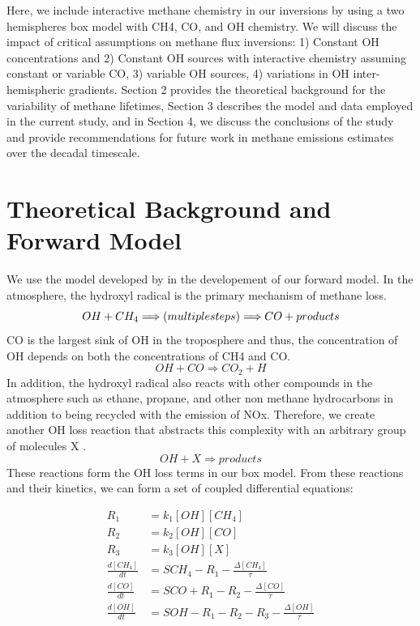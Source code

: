 \documentclass[two column,grl]{AGUTeX}
\begin{document}
\begin{article}
Here, we include interactive methane chemistry in our inversions by using a two hemispheres box model with CH4, CO, and OH chemistry. We will discuss the impact of critical assumptions on methane flux inversions: 1) Constant OH concentrations and 2) Constant OH sources with interactive chemistry assuming constant or variable CO, 3) variable OH sources, 4) variations in OH inter-hemispheric gradients. Section 2 provides the theoretical background for the variability of methane lifetimes, Section 3 describes the model and data employed in the current study, and in Section 4, we discuss the conclusions of the study and provide recommendations for future work in methane emissions estimates over the decadal timescale.



\section{Theoretical Background and Forward Model}
We use the model developed by \citep{prather_time_1996, prather1994lifetimes} in the developement of our forward model. In the atmosphere, the hydroxyl radical is the primary mechanism of methane loss. 
\begin{equation}
    OH + CH_4 \Longrightarrow (multiple steps) \Longrightarrow CO + products \\
\end{equation}
CO is the largest sink of OH in the troposphere and thus, the concentration of OH depends on both the concentrations of CH4 and CO.
\begin{equation}
    OH + CO \Longrightarrow CO_2 + H 
\end{equation}
In addition, the hydroxyl radical also reacts with other compounds in the atmosphere such as ethane, propane, and other non methane hydrocarbons in addition to being recycled with the emission of NOx. Therefore, we create another OH loss reaction that abstracts this complexity with an arbitrary group of molecules X \citep{prather_time_1996, prather1994lifetimes}.
\begin{equation}
    OH + X \Longrightarrow products 
\end{equation}
These reactions form the OH loss terms in our box model. From these reactions and their kinetics, we can form a set of coupled differential equations:

\begin{eqnarray}
    R_1 &= k_1 [OH] [CH_4] \\ 
    R_2 &= k_2 [OH] [CO] \\
    R_3 &= k_3 [OH] [X] \\
    \frac{d[CH_4]}{dt} &= SCH_4 - R_1 - \frac{\Delta[CH_4]}{\tau}\\
    \frac{d[CO]}{dt} &= SCO + R_1 - R_2 - \frac{\Delta[CO]}{\tau}\\
    \frac{d[OH]}{dt} &= SOH - R_1 - R_2 - R_3 - \frac{\Delta[OH]}{\tau}
  \end{eqnarray}


\end{article}
\end{document}
